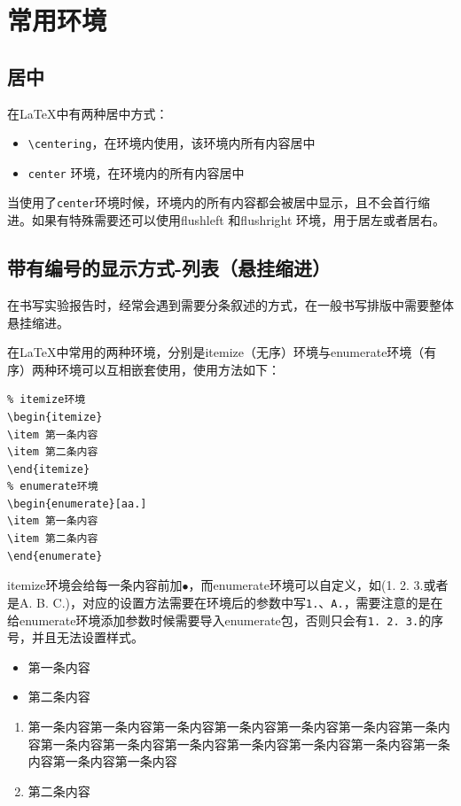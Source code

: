 \section{常用环境}
\subsection{居中}
在\LaTeX 中有两种居中方式：
\begin{itemize}
\item \verb|\centering|，在环境内使用，该环境内所有内容居中
\item \verb|center| 环境，在环境内的所有内容居中
\end{itemize}
\begin{center}
当使用了\verb|center|环境时候，环境内的所有内容都会被居中显示，且不会首行缩进。如果有特殊需要还可以使用flushleft 和flushright 环境，用于居左或者居右。
\end{center}
\subsection{带有编号的显示方式-列表（悬挂缩进）}
在书写实验报告时，经常会遇到需要分条叙述的方式，在一般书写排版中需要整体悬挂缩进。

在\LaTeX 中常用的两种环境，分别是itemize（无序）环境与enumerate环境（有序）两种环境可以互相嵌套使用，使用方法如下：
\begin{verbatim}
% itemize环境
\begin{itemize}
\item 第一条内容
\item 第二条内容
\end{itemize}
% enumerate环境
\begin{enumerate}[aa.]
\item 第一条内容
\item 第二条内容
\end{enumerate}
\end{verbatim}
itemize环境会给每一条内容前加$\bullet$，而enumerate环境可以自定义，如(1. 2. 3.或者是A. B. C.)，对应的设置方法需要在环境后的参数中写\verb|1.|、\verb|A.|，需要注意的是在给enumerate环境添加参数时候需要导入enumerate包，否则只会有\verb|1. 2. 3.|的序号，并且无法设置样式。
\begin{itemize}
\item 第一条内容
\item 第二条内容
\end{itemize}
\begin{enumerate}[aa.]
\item 第一条内容第一条内容第一条内容第一条内容第一条内容第一条内容第一条内容第一条内容第一条内容第一条内容第一条内容第一条内容第一条内容第一条内容第一条内容第一条内容
\item 第二条内容
\end{enumerate}
